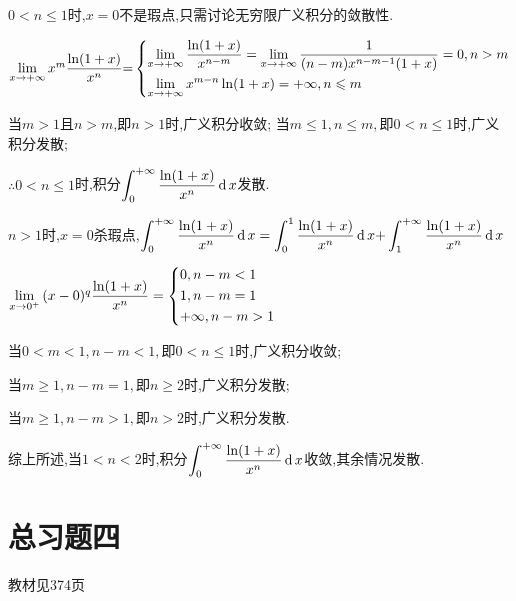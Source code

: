 $0 < n \leqslant 1$时,$x = 0$不是瑕点,只需讨论无穷限广义积分的敛散性.

$\lim\limits_{x \to +\infty} {x^m}\dfrac{{\ln (1 + x)}}{{{x^n}}}{=}\left\{ \begin{gathered}
  \lim\limits_{x \to +\infty} \dfrac{{\ln (1 + x)}}{{{x^{n - m}}}} = \lim\limits_{x \to +\infty} \frac{1}{{(n - m){x^{n - m - 1}}(1 + x)}} = 0,n > m \hfill \\
  \lim\limits_{x \to +\infty} {x^{m - n}}\ln (1 + x) =  + \infty ,n \leqslant m \hfill \\
\end{gathered}  \right.$

当$m > 1$且$n > m$,即$n > 1$时,广义积分收敛;
当$m \leqslant 1,n \leqslant m,$即$0 < n \leqslant 1$时,广义积分发散;

$\therefore 0 < n \leqslant 1$时,积分$\displaystyle\int_0^{ + \infty } {\dfrac{{\ln (1 + x)}}{{{x^n}}}\operatorname{\mathop{}\!\mathrm{d}} x} $发散.

$n > 1$时,$x = 0$杀瑕点,$\displaystyle\int_0^{ + \infty } {\dfrac{{\ln (1 + x)}}{{{x^n}}}\operatorname{\mathop{}\!\mathrm{d}} x}  = \displaystyle\int_0^1 {\dfrac{{\ln (1 + x)}}{{{x^n}}}\operatorname{\mathop{}\!\mathrm{d}} x + } \displaystyle\int_1^{ + \infty } {\dfrac{{\ln (1 + x)}}{{{x^n}}}\operatorname{\mathop{}\!\mathrm{d}} x} $

$\lim\limits_{x \to 0^+} {(x - 0)^q}\dfrac{{\ln (1 + x)}}{{{x^n}}} = \left\{ \begin{gathered}
  0,n - m < 1 \hfill \\
  1,n - m = 1 \hfill \\
   + \infty ,n - m > 1 \hfill \\
\end{gathered}  \right.$

当$0 < m < 1,n - m < 1,$即$0 < n \leqslant 1$时,广义积分收敛;

当$m \geqslant 1,n - m = 1,$即$n \geqslant 2$时,广义积分发散;

当$m \geqslant 1,n - m > 1,$即$n > 2$时,广义积分发散.

综上所述,当$1 < n < 2$时,积分$\displaystyle\int_0^{ + \infty } {\dfrac{{\ln (1 + x)}}{{{x^n}}}\operatorname{\mathop{}\!\mathrm{d}} x} $收敛,其余情况发散.





\section{总习题四}
\begin{flushright}
  \color{zhanqing!80}
   教材见374页 %
\end{flushright}

